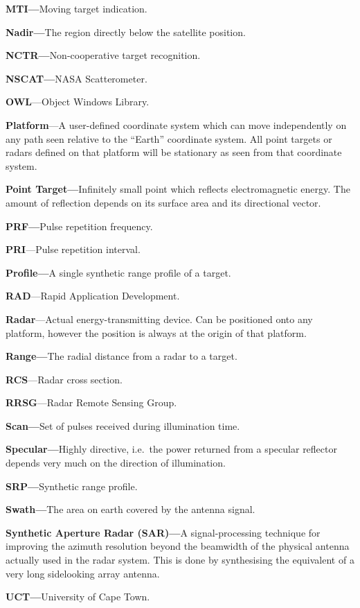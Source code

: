 \textbf{MTI---}Moving target indication.

\textbf{Nadir---}The region directly below the satellite position.

\textbf{NCTR---}Non-cooperative target recognition.

\textbf{NSCAT---}NASA Scatterometer.

\textbf{OWL}---Object Windows Library.

\textbf{Platform}---A user-defined coordinate system which can move
independently on any path seen relative to the ``Earth'' coordinate system.
All point targets or radars defined on that platform will be stationary as
seen from that coordinate system.

\textbf{Point Target---}Infinitely small point which reflects
electromagnetic energy. The amount of reflection depends on its surface area
and its directional vector.

\textbf{PRF---}Pulse repetition frequency.

\textbf{PRI}---Pulse repetition interval.

\textbf{Profile---}A single synthetic range profile of a target.

\textbf{RAD}---Rapid Application Development.

\textbf{Radar}---Actual energy-transmitting device. Can be positioned onto
any platform, however the position is always at the origin of that platform.

\textbf{Range---}The radial distance from a radar to a target.

\textbf{RCS}---Radar cross section.

\textbf{RRSG}---Radar Remote Sensing Group.

\textbf{Scan---}Set of pulses received during illumination time.

\textbf{Specular---}Highly directive, i.e.~the power returned from a
specular reflector depends very much on the direction of illumination.

\textbf{SRP---}Synthetic range profile.

\textbf{Swath---}The area on earth covered by the antenna signal.

\textbf{Synthetic Aperture Radar (SAR)---}A signal-processing technique for
improving the azimuth resolution beyond the beamwidth of the physical
antenna actually used in the radar system. This is done by synthesising the
equivalent of a very long sidelooking array antenna.

\textbf{UCT---}University of Cape Town.
